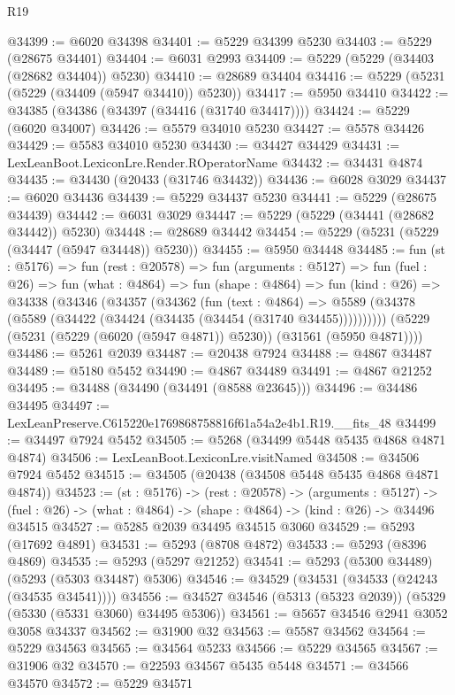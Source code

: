 \begin{lexlean}{R19}
\begin{coremodule}
@34399 := @6020 @34398
@34401 := @5229 @34399 @5230
@34403 := @5229 (@28675 @34401)
@34404 := @6031 @2993
@34409 := @5229 (@5229 (@34403 (@28682 @34404)) @5230)
@34410 := @28689 @34404
@34416 := @5229 (@5231 (@5229 (@34409 (@5947 @34410)) @5230))
@34417 := @5950 @34410
@34422 := @34385 (@34386 (@34397 (@34416 (@31740 @34417))))
@34424 := @5229 (@6020 @34007)
@34426 := @5579 @34010 @5230
@34427 := @5578 @34426
@34429 := @5583 @34010 @5230
@34430 := @34427 @34429
@34431 := LexLeanBoot.LexiconLre.Render.ROperatorName
@34432 := @34431 @4874
@34435 := @34430 (@20433 (@31746 @34432))
@34436 := @6028 @3029
@34437 := @6020 @34436
@34439 := @5229 @34437 @5230
@34441 := @5229 (@28675 @34439)
@34442 := @6031 @3029
@34447 := @5229 (@5229 (@34441 (@28682 @34442)) @5230)
@34448 := @28689 @34442
@34454 := @5229 (@5231 (@5229 (@34447 (@5947 @34448)) @5230))
@34455 := @5950 @34448
@34485 := fun (st : @5176) =>
  fun (rest : @20578) =>
  fun (arguments : @5127) =>
  fun (fuel : @26) =>
  fun (what : @4864) =>
  fun (shape : @4864) =>
  fun (kind : @26) =>
  @34338
    (@34346
      (@34357
        (@34362
          (fun (text : @4864) =>
          @5589 (@34378 (@5589 (@34422 (@34424 (@34435 (@34454 (@31740 @34455))))))))))
      (@5229 (@5231 (@5229 (@6020 (@5947 @4871)) @5230)) (@31561 (@5950 @4871))))
@34486 := @5261 @2039
@34487 := @20438 @7924
@34488 := @4867 @34487
@34489 := @5180 @5452
@34490 := @4867 @34489
@34491 := @4867 @21252
@34495 := @34488 (@34490 (@34491 (@8588 @23645)))
@34496 := @34486 @34495
@34497 := LexLeanPreserve.C615220e1769868758816f61a54a2e4b1.R19.__fits_48
@34499 := @34497 @7924 @5452
@34505 := @5268 (@34499 @5448 @5435 @4868 @4871 @4874)
@34506 := LexLeanBoot.LexiconLre.visitNamed
@34508 := @34506 @7924 @5452
@34515 := @34505 (@20438 (@34508 @5448 @5435 @4868 @4871 @4874))
@34523 := (st : @5176) ->
  (rest : @20578) ->
  (arguments : @5127) ->
  (fuel : @26) -> (what : @4864) -> (shape : @4864) -> (kind : @26) -> @34496 @34515
@34527 := @5285 @2039 @34495 @34515 @3060
@34529 := @5293 (@17692 @4891)
@34531 := @5293 (@8708 @4872)
@34533 := @5293 (@8396 @4869)
@34535 := @5293 (@5297 @21252)
@34541 := @5293 (@5300 @34489) (@5293 (@5303 @34487) @5306)
@34546 := @34529 (@34531 (@34533 (@24243 (@34535 @34541))))
@34556 := @34527 @34546 (@5313 (@5323 @2039)) (@5329 (@5330 (@5331 @3060) @34495 @5306))
@34561 := @5657 @34546 @2941 @3052 @3058 @34337
@34562 := @31900 @32
@34563 := @5587 @34562
@34564 := @5229 @34563
@34565 := @34564 @5233
@34566 := @5229 @34565
@34567 := @31906 @32
@34570 := @22593 @34567 @5435 @5448
@34571 := @34566 @34570
@34572 := @5229 @34571

\end{coremodule}
\end{lexlean}
